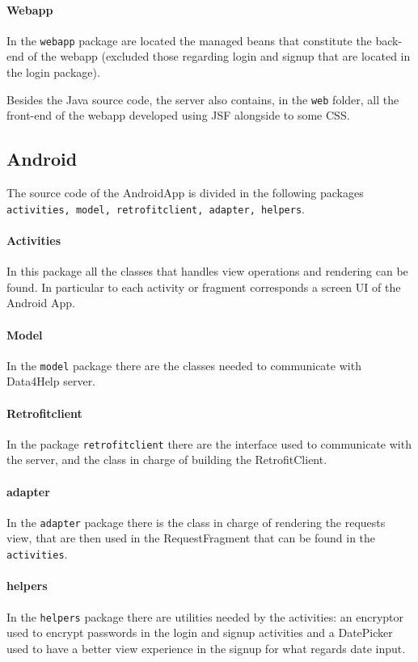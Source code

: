 \paragraph{Webapp}
In the \texttt{webapp} package are located the managed beans that constitute the back-end of the webapp (excluded those regarding login and signup that are located in the login package).

\vspace{1em}
\noindent
Besides the Java source code, the server also contains, in the \texttt{web} folder, all the front-end of the webapp developed using JSF alongside to some CSS.


\subsection{Android}

The source code of the AndroidApp is divided in the following packages \texttt{activities, model, retrofitclient, adapter, helpers}.

\paragraph{Activities}
In this package all the classes that handles view operations and rendering can be found. In particular to each activity or fragment corresponds a screen UI of the Android App.

\paragraph{Model}
In the \texttt{model} package there are the classes needed to communicate with Data4Help server.

\paragraph{Retrofitclient}
In the package \texttt{retrofitclient} there are the interface used to communicate with the server, and the class in charge of building the RetrofitClient.

\paragraph{adapter}
In the \texttt{adapter} package there is the class in charge of rendering the requests view, that are then used in the RequestFragment that can be found in the \texttt{activities}.

\paragraph{helpers}
In the \texttt{helpers} package there are utilities needed by the activities: an encryptor used to encrypt passwords in the login and signup activities and a DatePicker used to have a better view experience in the signup for what regards date input.


